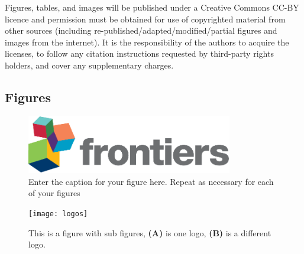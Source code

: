 \documentclass[utf8]{frontiers_suppmat} %
\begin{document}
Figures, tables, and images will be published under a Creative Commons CC-BY licence and permission must be obtained for use of copyrighted material from other sources (including re-published/adapted/modified/partial figures and images from the internet). It is the responsibility of the authors to acquire the licenses, to follow any citation instructions requested by third-party rights holders, and cover any supplementary charges.


\subsection{Figures}


\begin{figure}[htbp]
\begin{center}
\includegraphics[width=9cm]{logo1}%
\end{center}
\caption{ Enter the caption for your figure here.  Repeat as  necessary for each of your figures}\label{fig:1}
\end{figure}


\begin{figure}[htbp]
\begin{center}
\texttt{[image: logos]}
\end{center}
\caption{This is a figure with sub figures, \textbf{(A)} is one logo, \textbf{(B)} is a different logo.}\label{fig:2}
\end{figure}
\end{document}
